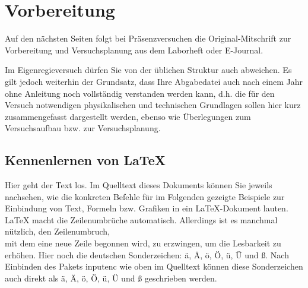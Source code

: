 \documentclass[a4paper,10pt]{report}
\begin{document}
	\chapter{Vorbereitung}
	
	Auf den nächsten Seiten folgt bei Präsenzversuchen die Original-Mitschrift zur Vorbereitung und Versuchsplanung aus dem Laborheft oder E-Journal.
	
	Im Eigenregieversuch dürfen Sie von der üblichen Struktur auch abweichen. Es gilt jedoch weiterhin der Grundsatz, dass Ihre Abgabedatei auch nach einem Jahr ohne Anleitung noch vollständig verstanden werden kann, d.h. die für den Versuch notwendigen physikalischen und technischen Grundlagen sollen hier kurz zusammengefasst dargestellt werden, ebenso wie Überlegungen zum Versuchsaufbau bzw. zur Versuchsplanung.
	
	
	
	\section{Kennenlernen von \LaTeX}
	
	\label{sec:Teilversuch1}
	
	Hier geht der Text los. Im Quelltext dieses Dokuments können Sie jeweils
	nachsehen, 
	wie die konkreten Befehle für im Folgenden gezeigte Beispiele zur Einbindung von
	Text, 
	Formeln bzw. Grafiken in ein \LaTeX-Dokument lauten. \\
	\LaTeX{} macht die Zeilenumbrüche automatisch.
	Allerdings ist es manchmal nützlich, den Zeilenumbruch, \\
	mit dem eine neue Zeile begonnen wird, zu erzwingen, um die Lesbarkeit 
	zu erhöhen. Hier noch die deutschen Sonderzeichen: 
	\"a, \"A, \"o, \"O, \"u, \"U und {\ss}. Nach Einbinden des Pakets 
	inputenc wie oben im Quelltext können diese Sonderzeichen auch direkt 
	als ä, Ä, ö, Ö, ü, Ü und ß geschrieben werden.
	
\end{document}
